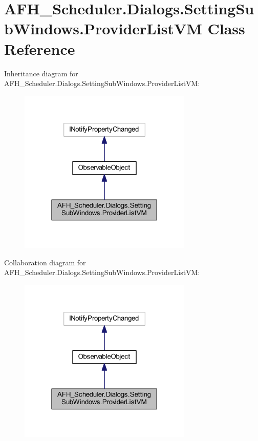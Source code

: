 \section{A\+F\+H\+\_\+\+Scheduler.\+Dialogs.\+Setting\+Sub\+Windows.\+Provider\+List\+VM Class Reference}
\label{class_a_f_h___scheduler_1_1_dialogs_1_1_setting_sub_windows_1_1_provider_list_v_m}


Inheritance diagram for A\+F\+H\+\_\+\+Scheduler.\+Dialogs.\+Setting\+Sub\+Windows.\+Provider\+List\+VM\+:
\nopagebreak
\begin{figure}[H]
\begin{center}
\leavevmode
\includegraphics[width=234pt]{class_a_f_h___scheduler_1_1_dialogs_1_1_setting_sub_windows_1_1_provider_list_v_m__inherit__graph}
\end{center}
\end{figure}


Collaboration diagram for A\+F\+H\+\_\+\+Scheduler.\+Dialogs.\+Setting\+Sub\+Windows.\+Provider\+List\+VM\+:
\nopagebreak
\begin{figure}[H]
\begin{center}
\leavevmode
\includegraphics[width=234pt]{class_a_f_h___scheduler_1_1_dialogs_1_1_setting_sub_windows_1_1_provider_list_v_m__coll__graph}
\end{center}
\end{figure}
